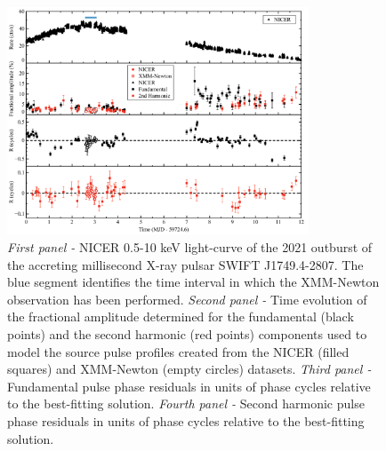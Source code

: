 \documentclass[fleqn,usenatbib]{mnras}
\newcommand{\swiftj}{SWIFT J1749.4-2807}
\newcommand{\nicer}{NICER}
\newcommand{\xmm}{XMM-Newton}
\begin{document}
\begin{figure}
\centering
\includegraphics[width=0.8\textwidth]{plot_lc_phase_residuals}
\caption{\textit{First panel -} \nicer{} 0.5-10 keV light-curve of the 2021 outburst of the accreting millisecond X-ray pulsar \swiftj{}. The blue segment identifies the time interval in which the \xmm{} observation has been performed. \textit{Second panel -} Time evolution of the fractional amplitude determined for the fundamental (black points) and the second harmonic (red points) components used to model the source pulse profiles created from the \nicer{} (filled squares) and \xmm{} (empty circles) datasets. \textit{Third panel -} Fundamental pulse phase residuals in units of phase cycles relative to the best-fitting solution. \textit{Fourth panel -} Second harmonic pulse phase residuals in units of phase cycles relative to the best-fitting solution.}
\label{fig:phase_fit}
\end{figure} 




\end{document}
